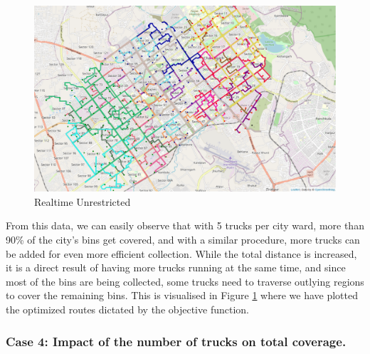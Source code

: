 \documentclass[12pt]{article}
\begin{document}
\begin{figure}[H]
    \centering
    \includegraphics[scale=0.4]{Dynamic5trucks.png}
    \caption{Realtime Unrestricted}\label{fig2}
\end{figure}

From this data, we can easily observe that with 5 trucks per city ward, more than 90\% of the city's bins get covered, and with a similar procedure, more trucks can be added for even more efficient collection. While the total distance is increased, it is a direct result of having more trucks running at the same time, and since most of the bins are being collected, some trucks need to traverse outlying regions to cover the remaining bins. This is visualised in Figure \ref{fig2} where we have plotted the optimized routes dictated by the objective function.

\subsubsection*{Case 4: Impact of the number of trucks on total coverage.}
\end{document}
